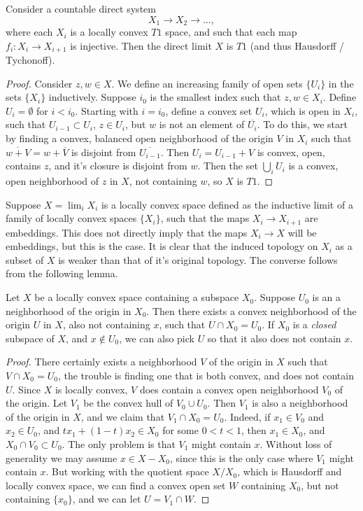 \begin{lemma}
    Consider a countable direct system
    \[ X_1 \to X_2 \to \dots, \]
    where each $X_i$ is a locally convex $T1$ space, and such that each map $f_i: X_i \to X_{i+1}$ is injective. Then the direct limit $X$ is $T1$ (and thus Hausdorff / Tychonoff).
\end{lemma}
\begin{proof}
    Consider $z,w \in X$. We define an increasing family of open sets $\{ U_i \}$ in the sets $\{ X_i \}$ inductively. Suppose $i_0$ is the smallest index such that $z,w \in X_i$. Define $U_i = \emptyset$ for $i < i_0$. Starting with $i = i_0$, define a convex set $U_i$, which is open in $X_i$, such that $U_{i-1} \subset U_i$, $z \in U_i$, but $w$ is not an element of $\overline{U_i}$. To do this, we start by finding a convex, balanced open neighborhood of the origin $V$ in $X_i$ such that $\overline{w + V} = w + \overline{V}$ is disjoint from $\overline{U_{i-1}}$. Then $U_i = U_{i-1} + V$ is convex, open, contains $z$, and it's closure is disjoint from $w$. Then the set $\bigcup_i U_i$ is a convex, open neighborhood of $z$ in $X$, not containing $w$, so $X$ is $T1$.
\end{proof}

Suppose $X = \lim_i X_i$ is a locally convex space defined as the inductive limit of a family of locally convex spaces $\{ X_i \}$, such that the maps $X_i \to X_{i+1}$ are embeddings. This does not directly imply that the maps $X_i \to X$ will be embeddings, but this is the case. It is clear that the induced topology on $X_i$ as a subset of $X$ is weaker than that of it's original topology. The converse follows from the following lemma.

\begin{lemma}
    Let $X$ be a locally convex space containing a subspace $X_0$. Suppose $U_0$ is an a neighborhood of the origin in $X_0$. Then there exists a convex neighborhood of the origin $U$ in $X$, also not containing $x$, such that $U \cap X_0 = U_0$. If $X_0$ is a \emph{closed} subspace of $X$, and $x \not \in U_0$, we can also pick $U$ so that it also does not contain $x$.
\end{lemma}
\begin{proof}
    There certainly exists a neighborhood $V$ of the origin in $X$ such that $V \cap X_0 = U_0$, the trouble is finding one that is both convex, and does not contain $U$. Since $X$ is locally convex, $V$ does contain a convex open neighborhood $V_0$ of the origin. Let $V_1$ be the convex hull of $V_0 \cup U_0$. Then $V_1$ is also a neighborhood of the origin in $X$, and we claim that $V_1 \cap X_0 = U_0$. Indeed, if $x_1 \in V_0$ and $x_2 \in U_0$, and $tx_1 + (1 - t)x_2 \in X_0$ for some $0 < t < 1$, then $x_1 \in X_0$, and $X_0 \cap V_0 \subset U_0$. The only problem is that $V_1$ might contain $x$. Without loss of generality we may assume $x \in X - X_0$, since this is the only case where $V_1$ might contain $x$. But working with the quotient space $X / X_0$, which is Hausdorff and locally convex space, we can find a convex open set $W$ containing $X_0$, but not containing $\{ x_0 \}$, and we can let $U = V_1 \cap W$.
\end{proof}

